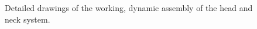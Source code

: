         \begin{figure}[h!]
        \centering
        \qquad
        \caption[Detailed drawings of the working, dynamic assembly of the head and neck system.]{Detailed drawings of the working, dynamic assembly of the head and neck system.}
        \label{fig:mechDesign-headSubDetail}
        \end{figure}
        
